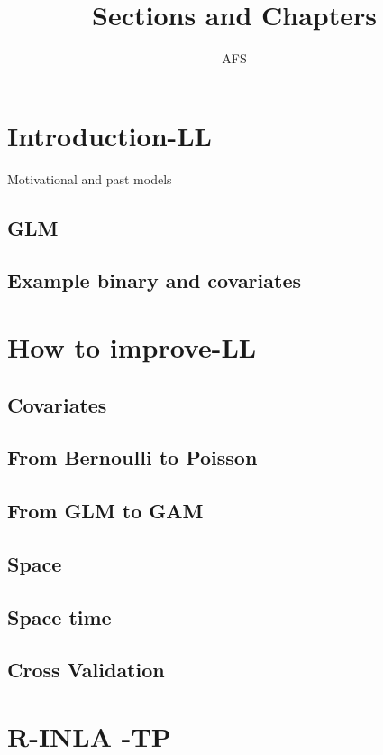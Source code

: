 \documentclass[12pt,a4paper]{article}
\title{Sections and Chapters}
\author{AFS}
\date{ }
\begin{document}
 
\tableofcontents
\newpage
\maketitle
 

\section{Introduction-LL}
Motivational and past models




\subsection{GLM}
\subsection{Example  binary and covariates} 


\section{How to improve-LL}
\subsection{Covariates}
\subsection{From Bernoulli to Poisson}

\subsection{From GLM to GAM}
\subsection{Space}
\subsection{Space time}


\subsection{Cross Validation}


\section{R-INLA -TP}
\end{document}
